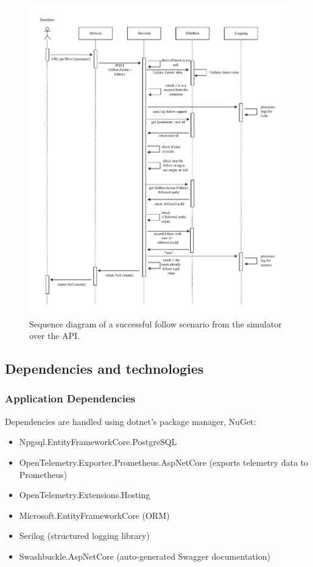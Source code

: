 \begin{figure}[H]
  \begin{center}
\includegraphics[width=\textwidth]{images/figures/Sequence-api.pdf}
    \caption{Sequence diagram of a successful follow scenario from the simulator over the API.}
    \label{fig:apicontroller}
  \end{center}
\end{figure}

\subsection{Dependencies and technologies}
\subsubsection{Application Dependencies}
Dependencies are handled using dotnet's package manager, NuGet:
\begin{itemize}
    \item Npgsql.EntityFrameworkCore.PostgreSQL 
    \item OpenTelemetry.Exporter.Prometheus.AspNetCore (exports telemetry data to Prometheus)
    \item OpenTelemetry.Extensions.Hosting
    \item Microsoft.EntityFrameworkCore (ORM)
    \item Serilog (structured logging library)
    \item Swashbuckle.AspNetCore (auto-generated Swagger documentation)
\end{itemize}

